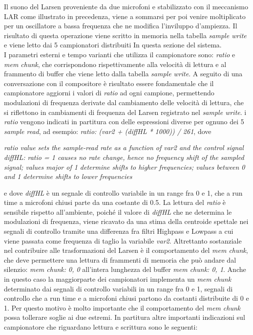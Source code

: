 Il suono del Larsen proveniente da due microfoni e stabilizzato con il meccanismo LAR come 
illustrato in precedenza, viene a sommarsi per poi venire moltiplicato per un oscillatore a bassa frequenza
che ne modifica l'inviluppo d'ampiezza. Il risultato di questa operazione viene scritto in memoria
nella tabella \textit{sample write} e viene letto dai 5 campionatori distribuiti In
questa sezione del sistema. \\
I parametri esterni e tempo varianti che utilizza il campionatore sono: \textit{ratio} e \textit{mem chunk},
che corrispondono rispettivamente alla velocità di lettura e al frammento di buffer che viene letto
dalla tabella \textit{sample write}.
A seguito di una conversazione con il compositore è risultato essere fondamentale che
il campionatore aggiorni i valori di \textit{ratio} ad ogni campione, permettendo modulazioni
di frequenza derivate dal cambiamento delle velocità di lettura,
che si riflettono in cambiamenti di frequenza del Larsen registrato nel \textit{sample write}.
i \textit{ratio} vengono indicati in partitura con delle espressioni diverse per ognuno
dei 5 \textit{sample read}, ad esempio: \textit{ratio: (var2 + (diffHL * 1000)) / 261}, dove 

\begin{center}
    \vspace{0.5cm}
    \textit{ratio value sets the sample-read rate as a function of var2 and the control signal diffHL: ratio = 1 causes no rate
    change, hence no frequency shift of the sampled signal; values major of 1 determine shifts to higher frequencies; values
    between 0 and 1 determine shifts to lower frequencies}
    \vspace{0.5cm}
\end{center}

e dove \textit{diffHL} è un segnale
di controllo variabile in un range fra 0 e 1, che a run time a microfoni chiusi parte da una costante di 0.5.
La lettura del \textit{ratio} è sensibile rispetto all'ambiente, poiché il valore di \textit{diffHL}
che ne determina le modulazioni di frequenza, viene ricavato da una stima della centroide spettale 
nei segnali di controllo tramite una differenza fra filtri Highpass e Lowpass 
a cui viene passata come frequenza di taglio la variabile \textit{var2}.
Altrettanto sostanziale nel contribuire alle trasformazioni del Larsen 
è il comportamento del \textit{mem chunk}, che deve permettere una lettura
di frammenti di memoria che può andare dal silenzio: \textit{mem chunk: 0, 0} all'intera
lunghezza del buffer \textit{mem chunk: 0, 1}.
Anche in questo caso la maggiorparte dei campionatori implementa un \textit{mem chunk} 
determinato dai segnali di controllo variabili in un range fra 0 e 1, 
segnali di controllo che a run time e a microfoni chiusi 
partono da costanti distribuite di 0 e 1.
Per questo motivo è molto importante che il comportamento del \textit{mem chunk} 
possa tollerare soglie ai due estremi.
In partitura altre importanti indicazioni sul campionatore che riguardano 
lettura e scrittura sono le seguenti:

